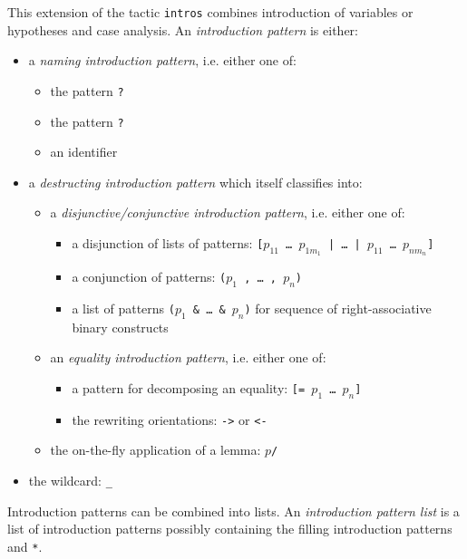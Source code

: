 \begin{coq_example*}
This extension of the tactic {\tt intros} combines introduction of
variables or hypotheses and case analysis. An {\em introduction pattern} is
either:
\begin{itemize}
\item a {\em naming introduction pattern}, i.e. either one of:
  \begin{itemize}
  \item the pattern \texttt{?}
  \item the pattern \texttt{?\ident}
  \item an identifier
  \end{itemize}
\item a {\em destructing introduction pattern} which itself classifies into:
  \begin{itemize}
  \item a {\em disjunctive/conjunctive introduction pattern}, i.e. either one of:
    \begin{itemize}
    \item a disjunction of lists of patterns:
      {\tt [$p_{11}$ \dots\ $p_{1m_1}$ | \dots\ | $p_{11}$ \dots\ $p_{nm_n}$]}
    \item a conjunction of patterns: {\tt ($p_1$ , \dots\ , $p_n$)}
    \item a list of patterns {\tt ($p_1$ \&\ \dots\ \&\ $p_n$)}
      for sequence of right-associative binary constructs
    \end{itemize}
  \item an {\em equality introduction pattern}, i.e. either one of:
    \begin{itemize}
    \item a pattern for decomposing an equality: {\tt [= $p_1$ \dots\ $p_n$]}
    \item the rewriting orientations: {\tt ->} or {\tt <-}
    \end{itemize}
  \item the on-the-fly application of a lemma: $p${\tt /{\term}}
  \end{itemize}
\item the wildcard: {\tt \_}
\end{itemize}

Introduction patterns can be combined into lists. An {\em introduction
  pattern list} is a list of introduction patterns possibly containing
the filling introduction patterns {\tt *} and {\tt **}.


\end{coq_example*}
